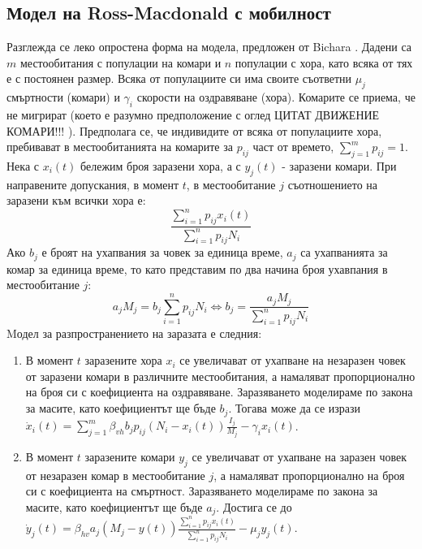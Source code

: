 \subsection{Модел на Ross-Macdonald с мобилност}
Разглежда се леко опростена форма на модела, предложен от Bichara \cite{Bichara2016}. Дадени са $m$ местообитания с популации на комари и $n$ популации с хора, като всяка от тях е с постоянен размер. Всяка от популациите си има своите съответни $\mu_j$ смъртности (комари) и $\gamma_i$ скорости на оздравяване (хора). Комарите се приема, че не мигрират (което е разумно предположение с оглед \color{Red} ЦИТАТ ДВИЖЕНИЕ КОМАРИ!!!
\color{Black}). Предполага се, че индивидите от всяка от популациите хора, пребивават в местообитанията на комарите за $p_{ij}$ част от времето, $\sum_{j=1}^m p_{ij} = 1$. \\
Нека с $x_i(t)$ бележим броя заразени хора, а с $y_j(t)$ - заразени комари. При направените допускания, в момент $t$, в местообитание $j$ съотношението на заразени към всички хора е:
\begin{equation}
  \frac{\sum_{i=1}^n p_{ij} x_i(t)}{\sum_{i=1}^n p_{ij} N_i}
\end{equation}
Ако $b_j$ е броят на ухапвания за човек за единица време, $a_j$ са ухапванията за комар за единица време, то като представим по два начина броя ухавпания в местообитание $j$:
\begin{equation}
  a_j M_j = b_j \sum_{i=1}^n p_{ij} N_i \iff b_j = \frac{a_j M_j}{\sum_{i=1}^n p_{ij} N_i}
\end{equation}
Mодел за разпространението на заразата е следния:
\begin{enumerate}
  \item В момент $t$ заразените хора $x_i$ се увеличават от ухапване на незаразен човек от заразени комари в различните местообитания, а намаляват пропорционално на броя си с коефициента на оздравяване. Заразяването моделираме по закона за масите, като коефициентът ще бъде $b_j$. Тогава може да се изрази $\dot{x}_i(t) = \sum_{j=1}^{m} \beta_{vh} b_j p_{ij} (N_i - x_i(t)) \frac{I_j}{M_j} - \gamma_i x_i(t)$.
  \item В момент $t$ заразените комари $y_j$ се увеличават от ухапване на заразен човек от незаразен комар в местообитание $j$, а намаляват пропорционално на броя си с коефициента на смъртност. Заразяването моделираме по закона за масите, като коефициентът ще бъде $a_j$. Достига се до $\dot{y}_j(t) = \beta_{hv} a_j (M_j - y(t)) \frac{\sum_{i=1}^n p_{ij} x_i(t)}{\sum_{i=1}^n p_{ij} N_i} - \mu_j y_j(t)$.
\end{enumerate}
